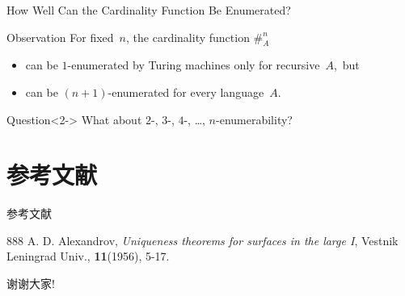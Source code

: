 \documentclass[12pt,hyperref={bookmarks=false},notheorems]{beamer}
\theoremstyle{definition}
\begin{document}
\begin{frame}{How Well Can the Cardinality Function Be Enumerated?}

 \begin{block}{Observation}
    For fixed~$n$, the cardinality function $\#_{\!A}^n$
    \begin{itemize}
    \item
      can be \alert{$1$}-enumerated by Turing machines only for \alert{recursive}~$A$,~but\hskip-0.5cm\hbox{}
    \item
      can be \alert{$(n+1)$}-enumerated for \alert{every} language~$A$.
    \end{itemize}
  \end{block}

  \begin{alertblock}{Question}<2->
    What about $2$-, $3$-, $4$-, \dots, $n$-enumerability?
  \end{alertblock}
\end{frame}
\section{参考文献}
\begin{frame}[allowframebreaks]{参考文献}
  \begin{thebibliography}
  {888}
   A. D. Alexandrov, \textit{Uniqueness theorems for
surfaces in the large I}, Vestnik Leningrad Univ., \textbf{11}(1956), 5-17.

 \end{thebibliography}
\end{frame}
\begin{frame}
  \begin{center}
  \Huge{} 谢谢大家!
  \end{center}
\end{frame}
\end{document}
